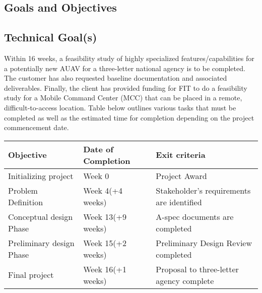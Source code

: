 \begin{fullwidth}
\section{Goals and Objectives}
\subsection{Technical Goal(s)}
Within 16 weeks, a feasibility study of highly specialized features/capabilities for a potentially new AUAV for a three-letter national agency is to be completed. The customer has also requested baseline documentation and associated deliverables. Finally, the client has provided funding for FIT to do a feasibility study for a Mobile Command Center (MCC) that can be placed in a remote, difficult-to-access location. Table below outlines various tasks that must be completed as well as the estimated time for completion depending on the project commencement date.

 \begin{table}[!b]
    \centering
    \begin{tabular}{|p{5cm}|p{3cm}|p{7cm}|}
    \hline
    \rowcolor[gray]{0.8}
    Objective & Date of \newline Completion & Exit criteria\\
    \hline
    Initializing project & Week 0 & Project Award  \\
    \hline
    Problem Definition & Week 4\newline(+4 weeks) & Stakeholder's requirements are identified\\
    \hline
    Conceptual design Phase & Week 13\newline(+9 weeks) &
    A-spec documents are completed\\
    \hline 
    Preliminary design Phase & Week 15\newline(+2 weeks) & Preliminary Design Review completed\\
    \hline
    Final project & Week 16\newline(+1 weeks) & Proposal to three-letter agency complete\\
    \hline 
    \end{tabular}
\end{table}
\end{fullwidth}